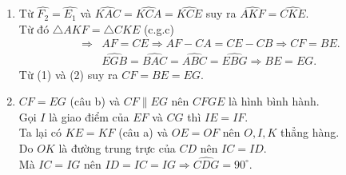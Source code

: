 \begin{bt}
{\begin{enumerate}
   \item Từ $\widehat{F_2}=\widehat{E_1}$ và $\widehat{KAC}=\widehat{KCA}=\widehat{KCE}$ suy ra $\widehat{AKF}=\widehat{CKE}$.\\
   Từ đó $\triangle AKF=\triangle CKE$ (c.g.c)
   \begin{align*}
	\Rightarrow & AF=CE\Rightarrow AF-CA=CE-CB\Rightarrow CF=BE.\tag{1}\\
	& \widehat{EGB}=\widehat{BAC}=\widehat{ABC}=\widehat{EBG}\Rightarrow BE=EG.\tag{2}
   \end{align*}
   Từ (1) và (2) suy ra $CF=BE=EG$.
   \item $CF=EG$ (câu b) và $CF\parallel EG$ nên $CFGE$ là hình bình hành.\\
   Gọi $I$ là giao điểm của $EF$ và $CG$ thì $IE=IF$.\\
   Ta lại có $KE=KF$ (câu a) và $OE=OF$ nên $O,I,K$ thẳng hàng.\\
   Do $OK$ là đường trung trực của $CD$ nên $IC=ID$.\\
   Mà $IC=IG$ nên $ID=IC=IG\Rightarrow \widehat{CDG}=90^\circ$.
  \end{enumerate}
  }
\end{bt}



